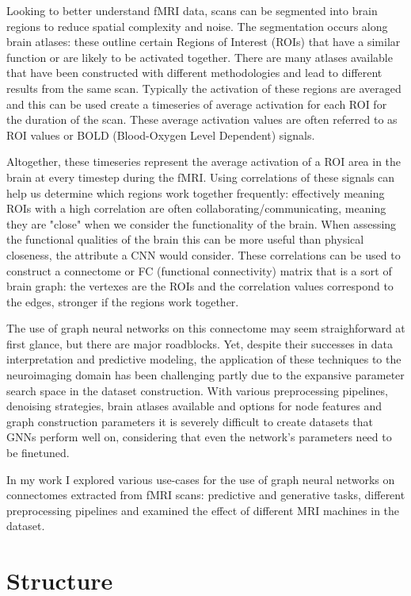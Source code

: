 Looking to better understand fMRI data, scans can be segmented into brain regions to reduce spatial complexity and noise. The segmentation occurs along brain atlases: these outline certain Regions of Interest (ROIs) that have a similar function or are likely to be activated together. There are many atlases available that have been constructed with different methodologies and lead to different results from the same scan. Typically the activation of these regions are averaged and this can be used create a timeseries of average activation for each ROI for the duration of the scan. These average activation values are often referred to as ROI values or BOLD (Blood-Oxygen Level Dependent) signals.

Altogether, these timeseries represent the average activation of a ROI area in the brain at every timestep during the fMRI. Using correlations of these signals can help us determine which regions work together frequently: effectively meaning ROIs with a high correlation are often collaborating/communicating, meaning they are "close" when we consider the functionality of the brain. When assessing the functional qualities of the brain this can be more useful than physical closeness, the attribute a CNN would consider. These correlations can be used to construct a connectome or FC (functional connectivity) matrix that is a sort of brain graph: the vertexes are the ROIs and the correlation values correspond to the edges, stronger if the regions work together.

The use of graph neural networks on this connectome may seem straighforward at first glance, but there are major roadblocks. Yet, despite their successes in data interpretation and predictive modeling, the application of these techniques to the neuroimaging domain has been challenging partly due to the expansive parameter search space in the dataset construction. With various preprocessing pipelines, denoising strategies, brain atlases available and options for node features and graph construction parameters it is severely difficult to create datasets that GNNs perform well on, considering that even the network's parameters need to be finetuned.

In my work I explored various use-cases for the use of graph neural networks on connectomes extracted from fMRI scans: predictive and generative tasks, different preprocessing pipelines and examined the effect of different MRI machines in the dataset.

\section{Structure}

